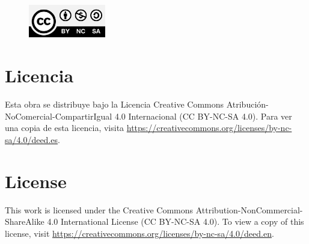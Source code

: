\newpage

\thispagestyle{empty}

\begin{figure}[ht]
    \centering
    \includegraphics[width=0.3\textwidth]{./images/CC-BY-NC-SA-4.0.jpg}
\end{figure}

\section*{Licencia}

Esta obra se distribuye bajo la Licencia Creative Commons Atribución-NoComercial-CompartirIgual 4.0 Internacional (CC BY-NC-SA 4.0). Para ver una copia de esta licencia, visita \url{https://creativecommons.org/licenses/by-nc-sa/4.0/deed.es}.

\section*{License}

This work is licensed under the Creative Commons Attribution-NonCommercial-ShareAlike 4.0 International License (CC BY-NC-SA 4.0). To view a copy of this license, visit \url{https://creativecommons.org/licenses/by-nc-sa/4.0/deed.en}.

\newpage
